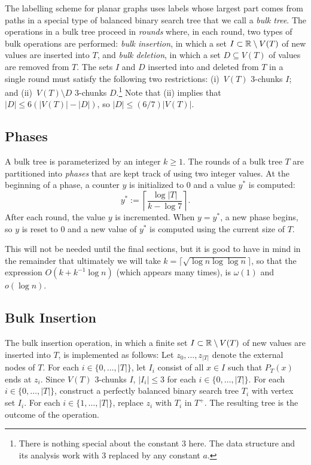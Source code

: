 \documentclass[kpfonts]{patmorin}
\newcommand{\snote}[1]{\fcolorbox{red}{yellow}{#1}}
\let\le\leqslant
\let\ge\geqslant
\begin{document}
The labelling scheme for planar graphs uses labels whose largest part comes from paths in a special type of balanced binary search tree that we call a \emph{bulk tree}.  The operations in a bulk tree proceed in \emph{rounds} where, in each round, two types of bulk operations are performed: \emph{bulk insertion}, in which a set $I\subset \mathbb{R}\setminus V(T)$ of new values are inserted into $T$, and \emph{bulk deletion}, in which a set $D\subseteq V(T)$ of values are removed from $T$. The sets $I$ and $D$ inserted into and deleted from $T$ in a single round must satisfy the following two restrictions: (i)~$V(T)$ $3$-chunks $I$; and (ii)~$V(T)\setminus D$ 3-chunks $D$.\footnote{There is nothing special about the constant $3$ here.  The data structure and its analysis work with $3$ replaced by any constant $a$.}  Note that (ii) implies that $|D|\le 6(|V(T)|-|D|)$, so $|D|\le (6/7)|V(T)|$.

\subsection{Phases}\label{sec:3.1}

A bulk tree is parameterized by an integer $k\ge 1$.  The rounds of a bulk tree $T$ are partitioned into \emph{phases} that are kept track of using two integer values.
At the beginning of a phase, a counter $y$ is initialized to $0$ and a value $y^*$ is computed:
\[  
  y^* := \left\lceil \frac{\log|T|}{k-\log 7}\right\rceil. 
\]
After each round, the value $y$ is incremented.  When $y=y^*$, a new phase begins, so $y$ is reset to 0 and a new value of $y^*$ is computed using the current size of $T$.

\smallskip

This will not be needed until the final sections, but it is good to have in mind in the remainder that ultimately we will take $k=\lceil\sqrt{\log n \log \log n}\rceil$, so that the expression $O(k+k^{-1}\log n)$ (which appears many times), is $\omega(1)$ and $o(\log n)$.

\subsection{Bulk Insertion}

The bulk insertion operation, in which a finite set $I\subset  \mathbb{R}\setminus V(T)$ of new values are inserted into $T$, is implemented as follows: Let $z_0,\ldots,z_{|T|}$ denote the external nodes of $T$.  For each $i\in\{0,\ldots,|T|\}$, let $I_i$ consist of all $x\in I$ such that $P_T(x)$ ends at $z_i$. 
Since $V(T)$ $3$-chunks $I$, $|I_i|\le 3$ for each $i\in\{0,\ldots,|T|\}$. For each $i\in\{0,\ldots,|T|\}$, construct a perfectly balanced binary search tree $T_i$ with vertex set $I_i$. For each $i\in\{1,\ldots,|T|\}$, replace $z_i$ with $T_i$ in $T^+$. 
The resulting tree is the outcome of the operation. 
\end{document}
